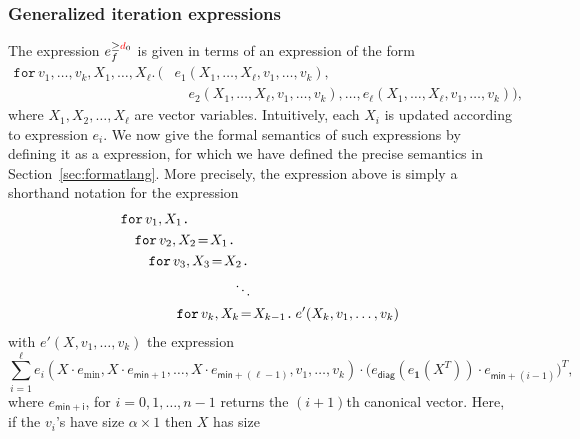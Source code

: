 \subsubsection{Generalized iteration expressions}\label{subsubsec:generalloop}
The expression $e_f^{\geq \EDIT{d}_0}$ is given in terms of an expression of the form 
\begin{align*}
    \texttt{for}\, v_1,\ldots, v_k,X_1,\ldots, X_\ell \texttt{.}\, \Big( &e_1(X_1,\ldots,X_\ell,v_1,\ldots, v_k), \\
    &\hspace{1em}e_2(X_1,\ldots, X_\ell,v_1,\ldots, v_k), \ldots, e_\ell(X_1,\ldots,X_\ell,v_1,\ldots, v_k) \Big),
\end{align*}
where $X_1,X_2,\ldots,X_\ell$ are vector variables. Intuitively, each $X_i$ is updated according to expression $e_i$.
We now give the formal semantics of such expressions by defining it as a \langfor expression, for which we have defined the precise semantics in Section~\ref{sec:formatlang}.
More precisely, the expression above is simply a shorthand notation for the \langfor expression
\begin{align*}
  &\ffor{v_1}{X_1}{} \\
  &\hspace{1em}\initf{X_1}{v_2}{X_2}{} \\
  &\hspace{2em}\initf{X_2}{v_3}{X_3}{} \\
  &\hspace{8em}\ddots \\
  &\hspace{4em}\initf{X_{k-1}}{v_k}{X_k}{ e'(X_k,v_1,\ldots, v_k)}
\end{align*}
with $e'(X,v_1,\ldots,v_k)$ the expression
$$
\sum_{i=1}^{\ell} e_i(X\cdot e_{\min}, X\cdot e_{\mathsf{min}+1},\ldots,X\cdot e_{\mathsf{min}+(\ell-1)},v_1,\ldots,v_k)\cdot \bigl(
e_{\mathsf{diag}}(e_{\mathbf{1}}(X^T))\cdot e_{\mathsf{min}+(i-1)}\bigr)^T,
%
$$
where $e_{\mathsf{min}+\mathsf{i}}$, for $i=0,1,\ldots,n-1$ returns the $(i+1)$th canonical vector. Here, if the $v_i$'s have
size $\alpha\times 1$ then $X$ has size
